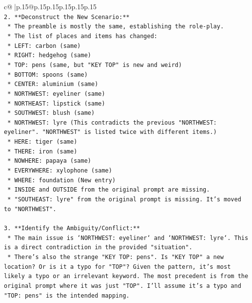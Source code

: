 \documentclass{article}
\begin{document}
{\begin{supertabular}{c@{$\;$}|p{.15\linewidth}@{}p{.15\linewidth}p{.15\linewidth}p{.15\linewidth}p{.15\linewidth}p{.15\linewidth}}
{{{\\ 
\texttt{2.  **Deconstruct the New Scenario:**} \\
\texttt{    *   The preamble is mostly the same, establishing the role{-}play.} \\
\texttt{    *   The list of places and items has changed:} \\
\texttt{        *   LEFT: carbon (same)} \\
\texttt{        *   RIGHT: hedgehog (same)} \\
\texttt{        *   TOP: pens (same, but "KEY TOP" is new and weird)} \\
\texttt{        *   BOTTOM: spoons (same)} \\
\texttt{        *   CENTER: aluminium (same)} \\
\texttt{        *   NORTHWEST: eyeliner (same)} \\
\texttt{        *   NORTHEAST: lipstick (same)} \\
\texttt{        *   SOUTHWEST: blush (same)} \\
\texttt{        *   NORTHWEST: lyre (This contradicts the previous "NORTHWEST: eyeliner". "NORTHWEST" is listed twice with different items.)} \\
\texttt{        *   HERE: tiger (same)} \\
\texttt{        *   THERE: iron (same)} \\
\texttt{        *   NOWHERE: papaya (same)} \\
\texttt{        *   EVERYWHERE: xylophone (same)} \\
\texttt{        *   WHERE: foundation (New entry)} \\
\texttt{        *   INSIDE and OUTSIDE from the original prompt are missing.} \\
\texttt{        *   "SOUTHEAST: lyre" from the original prompt is missing. It's moved to "NORTHWEST".} \\
\\ 
\texttt{3.  **Identify the Ambiguity/Conflict:**} \\
\texttt{    *   The main issue is `NORTHWEST: eyeliner` and `NORTHWEST: lyre`. This is a direct contradiction in the provided "situation".} \\
\texttt{    *   There's also the strange "KEY TOP: pens". Is "KEY TOP" a new location? Or is it a typo for "TOP"? Given the pattern, it's most likely a typo or an irrelevant keyword. The most precedent is from the original prompt where it was just "TOP". I'll assume it's a typo and "TOP: pens" is the intended mapping.} \\
}}}
\end{supertabular}}
\end{document}
